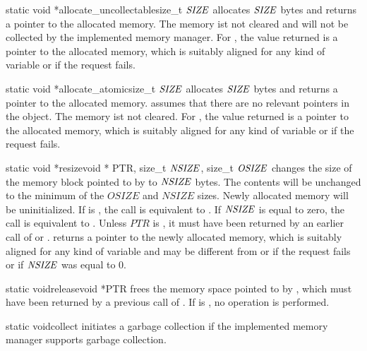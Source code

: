 \begin{fcode}{{static void *}}{allocate_uncollectable}{size_t $\mathit{SIZE}$}
  allocates $\mathit{SIZE}$ bytes and returns a pointer to the allocated memory. The memory ist not
  cleared and will not be collected by the implemented memory manager.  For
  , the value returned is a pointer to the allocated memory,
  which is suitably aligned for any kind of variable or  if the request fails.
\end{fcode}

\begin{fcode}{{static void *}}{allocate_atomic}{size_t $\mathit{SIZE}$}
  allocates $\mathit{SIZE}$ bytes and returns a pointer to the allocated memory.
   assumes that there are no relevant pointers in the object.
  The memory ist not cleared.  For , the value returned is a
  pointer to the allocated memory, which is suitably aligned for any kind of variable or
   if the request fails.
\end{fcode}

\begin{fcode}{{static void *}}{resize}{void * PTR, size_t $\mathit{NSIZE}$, size_t $\mathit{OSIZE}$}
  changes the size of the memory block pointed to by  to $\mathit{NSIZE}$ bytes. The contents
  will be unchanged to the minimum of the $OSIZE$ and $NSIZE$ sizes. Newly allocated memory will
  be uninitialized. If  is , the call is equivalent to
  . If $\mathit{NSIZE}$ is equal to zero, the call is equivalent to
  . Unless $PTR$ is , it must have been returned by an earlier
  call of  or .
   returns a pointer to the newly allocated memory, which is
  suitably aligned for any kind of variable and may be different from  or  if
  the request fails or if $\mathit{NSIZE}$ was equal to 0.
\end{fcode}

\begin{fcode}{{static void}}{release}{void *PTR}
  frees the memory space pointed to by , which must have been returned by a previous
  call of .  If  is , no operation is performed.
\end{fcode}

\begin{fcode}{{static void}}{collect}{}
  initiates a garbage collection if the implemented memory manager supports garbage collection.
\end{fcode}


